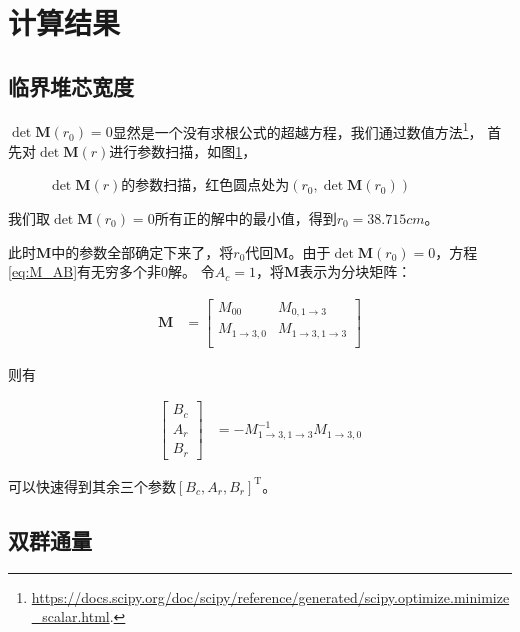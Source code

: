 \section{计算结果}
\label{sec:results}

\subsection{临界堆芯宽度}

$\det \pmb{M}(r_0)=0$显然是一个没有求根公式的超越方程，我们通过数值方法\footnote{\url{https://docs.scipy.org/doc/scipy/reference/generated/scipy.optimize.minimize\_scalar.html}.}，
首先对$\det \pmb{M}(r)$进行参数扫描，如图\ref{fig:det_M}，

\begin{figure}[H]
    \centering
    
    \caption{$\det \pmb{M}(r)$的参数扫描，红色圆点处为$\left(r_0,\det \pmb{M}(r_0)\right)$}
    \label{fig:det_M}
\end{figure}

我们取$\det \pmb{M}(r_0)=0$所有正的解中的最小值，得到$r_0=38.715\si{cm}$。

此时$\pmb{M}$中的参数全部确定下来了，将$r_0$代回$\pmb{M}$。由于$\det \pmb{M}(r_0)=0$，方程\ref{eq:M_AB}有无穷多个非0解。
令$A_c=1$，将$\pmb{M}$表示为分块矩阵：

\begin{align}
    \pmb{M} &= \begin{bmatrix}
        M_{00} & M_{0,1\rightarrow 3} \\
        M_{1\rightarrow 3,0} & M_{1\rightarrow 3,1\rightarrow 3} \\
    \end{bmatrix}
\end{align}

则有

\begin{align}
    \begin{bmatrix}
        B_c \\
        A_r \\
        B_r
    \end{bmatrix} &= 
    -M_{1\rightarrow 3,1\rightarrow 3}^{-1}M_{1\rightarrow 3,0}
\end{align}

可以快速得到其余三个参数$\left[B_c,A_r,B_r\right]^{\mathrm{T}}$。

\subsection{双群通量}

